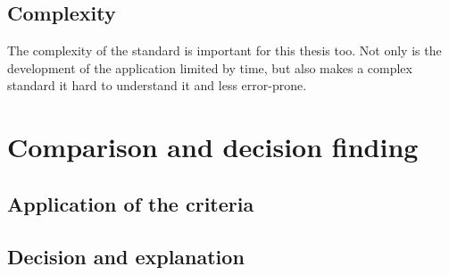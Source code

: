 \subsection{Complexity}
\label{sec2.2.5}
The complexity of the standard is important for this thesis too. Not only is the development of the application limited by time, but also makes a complex standard it hard to understand it and less error-prone.

\section{Comparison and decision finding}
\label{sec2.3}

\subsection{Application of the criteria}
\label{sec2.3.1}

\subsection{Decision and explanation}
\label{sec2.3.2}
